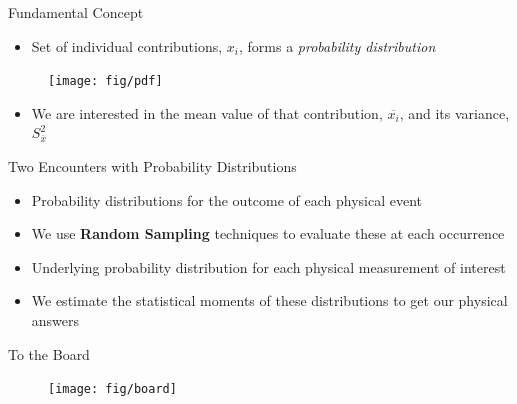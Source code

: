 \documentclass[xcolor=x11names,compress, handout]{beamer}
\renewcommand{\(}{\begin{columns}}
\renewcommand{\)}{\end{columns}}
\newcommand{\<}[1]{\begin{column}{#1}}
\renewcommand{\>}{\end{column}}
\begin{document}
\begin{frame}{Fundamental Concept}

\begin{itemize}
  \item Set of individual contributions, ${x_i}$,
forms a \textit{probability distribution}
\end{itemize}
  	\begin{figure}
  	\begin{center}
  		\texttt{[image: fig/pdf]}
	\end{center}
  	\end{figure}

\begin{itemize}
  \item We are interested in the mean value of that contribution, $\overline{x_i}$, and its variance, $S_{\overline{x}}^2$
\end{itemize}

\end{frame}


\begin{frame}{Two Encounters with Probability Distributions}

\begin{itemize}
    \item Probability distributions for the outcome
of each physical event
    \item We use \textbf{Random Sampling} techniques to
evaluate these at each occurrence
    \item Underlying probability distribution for
each physical measurement of interest
    \item We estimate the statistical moments of
these distributions to get our physical
answers
\end{itemize}
\end{frame}


\begin{frame}{To the Board}

  	\begin{figure}
  	\begin{center}
  		\texttt{[image: fig/board]}
	\end{center}
  	\end{figure}

\end{frame}
\end{document}
